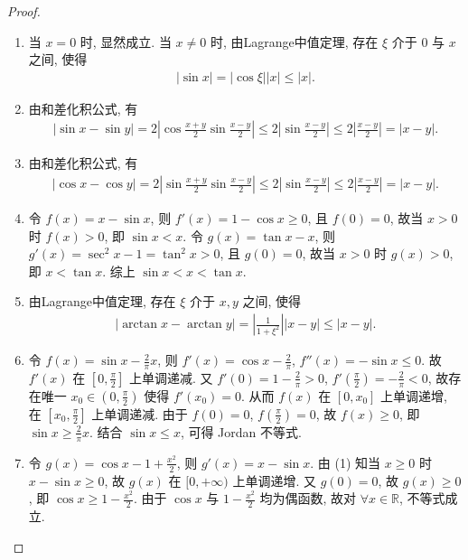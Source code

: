 \documentclass[../../main.tex]{subfiles}%
\begin{document}
\begin{proof}
\begin{enumerate}[(1)]
\item 当 $x=0$ 时, 显然成立. 当 $x \neq 0$ 时, 由Lagrange中值定理, 存在 $\xi$ 介于 $0$ 与 $x$ 之间, 使得
\begin{align*}
|\sin x| = |\cos \xi||x| \leqslant |x|.
\end{align*}
\item 由和差化积公式, 有
\begin{align*}
|\sin x-\sin y| = 2\left|\cos\frac{x+y}{2}\sin\frac{x-y}{2}\right| \leqslant 2\left|\sin\frac{x-y}{2}\right| \leqslant 2\left|\frac{x-y}{2}\right| = |x-y|.
\end{align*}
\item 由和差化积公式, 有
\begin{align*}
|\cos x-\cos y| = 2\left|\sin\frac{x+y}{2}\sin\frac{x-y}{2}\right| \leqslant 2\left|\sin\frac{x-y}{2}\right| \leqslant 2\left|\frac{x-y}{2}\right| = |x-y|.
\end{align*}
\item 令 $f(x)=x-\sin x$, 则 $f'(x)=1-\cos x \geqslant 0$, 且 $f(0)=0$, 故当 $x>0$ 时 $f(x)>0$, 即 $\sin x < x$. 令 $g(x)=\tan x-x$, 则 $g'(x)=\sec^2 x-1=\tan^2 x>0$, 且 $g(0)=0$, 故当 $x>0$ 时 $g(x)>0$, 即 $x<\tan x$. 综上 $\sin x<x<\tan x$.
\item 由Lagrange中值定理, 存在 $\xi$ 介于 $x,y$ 之间, 使得
\begin{align*}
|\arctan x-\arctan y| = \left|\frac{1}{1+\xi^2}\right||x-y| \leqslant |x-y|.
\end{align*}
\item 令 $f(x)=\sin x-\frac{2}{\pi}x$, 则 $f'(x)=\cos x-\frac{2}{\pi}$, $f''(x)=-\sin x \leqslant 0$. 故 $f'(x)$ 在 $[0,\frac{\pi}{2}]$ 上单调递减. 又 $f'(0)=1-\frac{2}{\pi}>0$, $f'(\frac{\pi}{2})=-\frac{2}{\pi}<0$, 故存在唯一 $x_0 \in (0,\frac{\pi}{2})$ 使得 $f'(x_0)=0$. 从而 $f(x)$ 在 $[0,x_0]$ 上单调递增, 在 $[x_0,\frac{\pi}{2}]$ 上单调递减. 由于 $f(0)=0$, $f(\frac{\pi}{2})=0$, 故 $f(x) \geqslant 0$, 即 $\sin x \geqslant \frac{2}{\pi}x$. 结合 $\sin x \leqslant x$, 可得 Jordan 不等式.
\item 令 $g(x)=\cos x-1+\frac{x^2}{2}$, 则 $g'(x)=x-\sin x$. 由 (1) 知当 $x \geqslant 0$ 时 $x-\sin x \geqslant 0$, 故 $g(x)$ 在 $[0,+\infty)$ 上单调递增. 又 $g(0)=0$, 故 $g(x) \geqslant 0$, 即 $\cos x \geqslant 1-\frac{x^2}{2}$. 由于 $\cos x$ 与 $1-\frac{x^2}{2}$ 均为偶函数, 故对 $\forall x \in \mathbb{R}$, 不等式成立.
\end{enumerate}
\end{proof}
\end{document}
